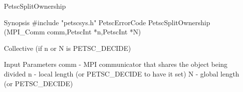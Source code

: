 PetscSplitOwnership

Synopsis
#include "petscsys.h"
PetscErrorCode  PetscSplitOwnership
   (MPI_Comm comm,PetscInt *n,PetscInt *N)

Collective (if n or N is PETSC_DECIDE)

Input Parameters
comm - MPI communicator that shares the object being divided
n - local length (or PETSC_DECIDE to have it set)
N - global length (or PETSC_DECIDE)
